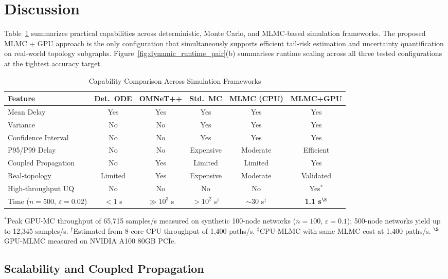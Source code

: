 \documentclass[journal]{IEEEtran}
\begin{document}
\section{Discussion}
\label{sec:discussion}

Table~\ref{tab:capability} summarizes practical capabilities across deterministic,
Monte Carlo, and MLMC-based simulation frameworks. The proposed MLMC + GPU approach is the only
configuration that simultaneously supports efficient tail-risk estimation and uncertainty
quantification on real-world topology subgraphs. Figure~\ref{fig:dynamic_runtime_pair}(b)
summarises runtime scaling across all three tested configurations at the tightest accuracy
target.

\begin{table}[!t]
\caption{Capability Comparison Across Simulation Frameworks}
\label{tab:capability}
\centering\small
\begin{tabular*}{\textwidth}{@{\extracolsep\fill}p{2.8cm} c c c c c@{}}
\toprule
Feature & Det.\ ODE & OMNeT++ & Std.\ MC & MLMC (CPU) & MLMC+GPU \\
\midrule
Mean Delay & Yes & Yes & Yes & Yes & Yes \\
Variance & No & No & Yes & Yes & Yes \\
Confidence Interval & No & No & Yes & Yes & Yes \\
P95/P99 Delay & No & No & Expensive & Moderate & Efficient \\
Coupled Propagation & No & Yes & Limited & Limited & Yes \\
Real-topology & Limited & Yes & Expensive & Moderate & Validated \\
High-throughput UQ & No & No & No & No & Yes$^*$ \\
\midrule
Time ($n=500$, $\varepsilon=0.02$) & $<1$ s & $\gg10^3$ s & $>10^2$ s$^\dagger$ &
$\sim30$ s$^\ddagger$ & \textbf{1.1 s}$^\S$ \\
\bottomrule
\end{tabular*}
\vspace{2pt}
\footnotesize
$^*$Peak GPU-MC throughput of 65,715 samples/s measured on synthetic 100-node networks
($n=100$, $\varepsilon=0.1$); 500-node networks yield up to 12,345 samples/s.
$^\dagger$Estimated from 8-core CPU throughput of 1,400 paths/s.
$^\ddagger$CPU-MLMC with same MLMC cost at 1,400 paths/s.
$^\S$GPU-MLMC measured on NVIDIA A100 80GB PCIe.
\end{table}

\subsection{Scalability and Coupled Propagation}
\label{subsec:scaling}
\end{document}
